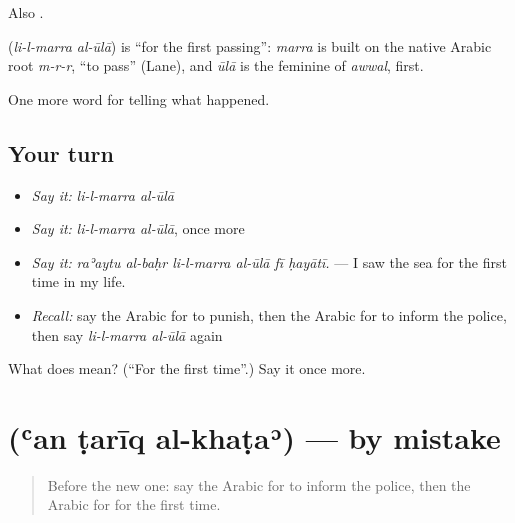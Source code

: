 Also  .

\begin{cousinweb}
\textbf{ } (\emph{li-l-marra al-ūlā}) is \textquotedblleft{}for the first passing\textquotedblright{}: \emph{marra} is built on the native Arabic root \emph{m-r-r}, \textquotedblleft{}to pass\textquotedblright{} (Lane), and \emph{ūlā} is the feminine of \emph{awwal}, first.
\end{cousinweb}

\begin{grammarlens}[title={What you've built}]
One more word for telling what happened.
\end{grammarlens}

\subsection*{Your turn}
\begin{itemize}
\raggedright
  \item \emph{Say it:} \emph{li-l-marra al-ūlā}
  \item \emph{Say it:} \emph{li-l-marra al-ūlā}, once more
  \item \emph{Say it:} \emph{raʾaytu al-baḥr li-l-marra al-ūlā fī ḥayātī.} — I saw the sea for the first time in my life.
  \item \emph{Recall:} say the Arabic for to punish, then the Arabic for to inform the police, then say \emph{li-l-marra al-ūlā} again
\end{itemize}

\begin{tcolorbox}[breakable,colback=teal!4,colframe=teal!35!black,title={Before you move on}]
What does   mean? (\textquotedblleft{}For the first time\textquotedblright{}.) Say it once more.
\end{tcolorbox}
\section[\texorpdfstring{\ar{عن} \ar{طريق} \ar{الخطأ} (ʿan ṭarīq al-khaṭaʾ)}{عن طريق الخطأ (ʿan ṭarīq al-khaṭaʾ)}]{   (ʿan ṭarīq al-khaṭaʾ) — by mistake}

\label{lesson:AR-C349-an-tariq-al-khata}



\begin{quote}
Before the new one: say the Arabic for to inform the police, then the Arabic for for the first time.
\end{quote}

